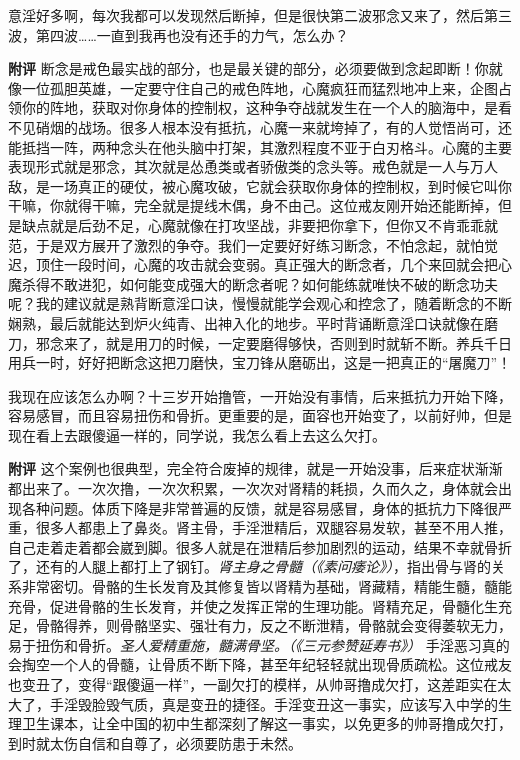 \begin{case}
    意淫好多啊，每次我都可以发现然后断掉，但是很快第二波邪念又来了，然后第三波，第四波……一直到我再也没有还手的力气，怎么办？

    \textbf{附评} 断念是戒色最实战的部分，也是最关键的部分，必须要做到念起即断！你就像一位孤胆英雄，一定要守住自己的戒色阵地，心魔疯狂而猛烈地冲上来，企图占领你的阵地，获取对你身体的控制权，这种争夺战就发生在一个人的脑海中，是看不见硝烟的战场。很多人根本没有抵抗，心魔一来就垮掉了，有的人觉悟尚可，还能抵挡一阵，两种念头在他头脑中打架，其激烈程度不亚于白刃格斗。心魔的主要表现形式就是邪念，其次就是怂恿类或者骄傲类的念头等。戒色就是一人与万人敌，是一场真正的硬仗，被心魔攻破，它就会获取你身体的控制权，到时候它叫你干嘛，你就得干嘛，完全就是提线木偶，身不由己。这位戒友刚开始还能断掉，但是缺点就是后劲不足，心魔就像在打攻坚战，非要把你拿下，但你又不肯乖乖就范，于是双方展开了激烈的争夺。我们一定要好好练习断念，不怕念起，就怕觉迟，顶住一段时间，心魔的攻击就会变弱。真正强大的断念者，几个来回就会把心魔杀得不敢进犯，如何能变成强大的断念者呢？如何能练就唯快不破的断念功夫呢？我的建议就是熟背断意淫口诀，慢慢就能学会观心和控念了，随着断念的不断娴熟，最后就能达到炉火纯青、出神入化的地步。平时背诵断意淫口诀就像在磨刀，邪念来了，就是用刀的时候，一定要磨得够快，否则到时就斩不断。养兵千日用兵一时，好好把断念这把刀磨快，宝刀锋从磨砺出，这是一把真正的“屠魔刀”！
\end{case}

\begin{case}
    我现在应该怎么办啊？十三岁开始撸管，一开始没有事情，后来抵抗力开始下降，容易感冒，而且容易扭伤和骨折。更重要的是，面容也开始变了，以前好帅，但是现在看上去跟傻逼一样的，同学说，我怎么看上去这么欠打。

    \textbf{附评} 这个案例也很典型，完全符合废掉的规律，就是一开始没事，后来症状渐渐都出来了。一次次撸，一次次积累，一次次对肾精的耗损，久而久之，身体就会出现各种问题。体质下降是非常普遍的反馈，就是容易感冒，身体的抵抗力下降很严重，很多人都患上了鼻炎。肾主骨，手淫泄精后，双腿容易发软，甚至不用人推，自己走着走着都会崴到脚。很多人就是在泄精后参加剧烈的运动，结果不幸就骨折了，还有的人腿上都打上了钢钉。\textit{肾主身之骨髓（《素问痿论》）}，指出骨与肾的关系非常密切。骨骼的生长发育及其修复皆以肾精为基础，肾藏精，精能生髓，髓能充骨，促进骨骼的生长发育，并使之发挥正常的生理功能。肾精充足，骨髓化生充足，骨骼得养，则骨骼坚实、强壮有力，反之不断泄精，骨骼就会变得萎软无力，易于扭伤和骨折。\textit{圣人爱精重施，髓满骨坚。（《三元参赞延寿书》）} 手淫恶习真的会掏空一个人的骨髓，让骨质不断下降，甚至年纪轻轻就出现骨质疏松。这位戒友也变丑了，变得“跟傻逼一样”，一副欠打的模样，从帅哥撸成欠打，这差距实在太大了，手淫毁脸毁气质，真是变丑的捷径。手淫变丑这一事实，应该写入中学的生理卫生课本，让全中国的初中生都深刻了解这一事实，以免更多的帅哥撸成欠打，到时就太伤自信和自尊了，必须要防患于未然。
\end{case}


